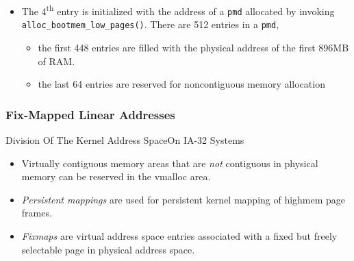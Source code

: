 \begin{itemize}
  Line \href{http://lxr.linux.no/linux+v2.6.11/arch/i386/kernel/head.S\#L417}{417} in
  \texttt{arch/i386/kernel/head.S}:
  \begin{center}
\begin{gascode}
ENTRY(empty_zero_page)
    .fill 4096,1,0
\end{gascode}
  \end{center}
\item The 4\textsuperscript{th} entry is initialized with the address of a \texttt{pmd}
  allocated by invoking \texttt{alloc\_bootmem\allowbreak\_low\_pages()}. There are 512
  entries in a \texttt{pmd},
  \begin{itemize}
  \item the first 448 entries are filled with the physical address of the first 896MB
    of RAM.
  \item the last 64 entries are reserved for noncontiguous memory allocation 
  \end{itemize}
\end{itemize}

\subsubsection{Fix-Mapped Linear Addresses}

\begin{frame}{Division Of The Kernel Address Space}{On IA-32 Systems}
  \begin{center}
  \end{center}
  \begin{itemize}
  \item Virtually contiguous memory areas that are \emph{not} contiguous in physical
    memory can be reserved in the vmalloc area.
  \item \emph{Persistent mappings} are used for persistent kernel mapping of highmem page frames.
  \item \emph{Fixmaps} are virtual address space entries associated with a fixed but
    freely selectable page in physical address space.
  \end{itemize}
\end{frame}

